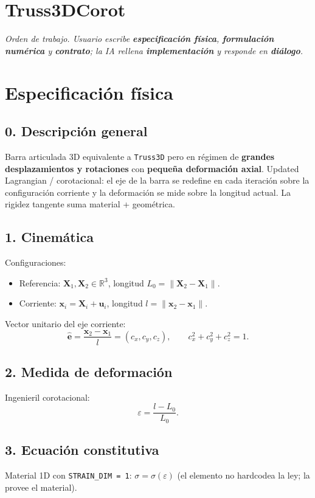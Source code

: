 \documentclass[11pt,letterpaper,oneside]{report}
\begin{document}
\newpage

\section{Truss3DCorot}



\textit{Orden de trabajo. Usuario escribe \textbf{especificación física}, \textbf{formulación numérica} y \textbf{contrato}; la IA rellena \textbf{implementación} y responde en \textbf{diálogo}.}



\section{Especificación física}

\subsection{0. Descripción general}
Barra articulada 3D equivalente a \texttt{Truss3D} pero en régimen de \textbf{grandes desplazamientos y rotaciones} con \textbf{pequeña deformación axial}. Updated Lagrangian / corotacional: el eje de la barra se redefine en cada iteración sobre la configuración corriente y la deformación se mide sobre la longitud actual. La rigidez tangente suma material + geométrica.

\subsection{1. Cinemática}
Configuraciones:
\begin{itemize}
  \item Referencia: $\mathbf X_1, \mathbf X_2 \in \mathbb{R}^3$, longitud $L_0 = \|\mathbf X_2 - \mathbf X_1\|$.
  \item Corriente: $\mathbf x_i = \mathbf X_i + \mathbf u_i$, longitud $l = \|\mathbf x_2 - \mathbf x_1\|$.
\end{itemize}

Vector unitario del eje corriente:
\[
\hat{\mathbf e} = \frac{\mathbf x_2 - \mathbf x_1}{l} = (c_x, c_y, c_z), \qquad c_x^2 + c_y^2 + c_z^2 = 1.
\]

\subsection{2. Medida de deformación}
Ingenieril corotacional:
\[
\varepsilon = \frac{l - L_0}{L_0}.
\]

\subsection{3. Ecuación constitutiva}
Material 1D con \texttt{STRAIN\_DIM = 1}: $\sigma = \sigma(\varepsilon)$ (el elemento no hardcodea la ley; la provee el material).
\end{document}
